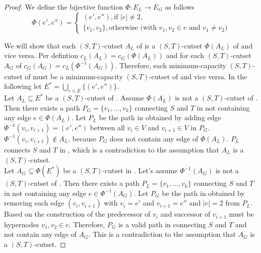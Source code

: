 \begin{proof}


We define the bijective function $\Phi: E_L \rightarrow E_G$ as follows
\[ \Phi(e',e'') = 
   \begin{cases}
      (e',e''), \text{if } |e| \neq 2, \\
      \{v_1,v_2\}, \text{otherwise (with $v_1,v_2 \in e$ and $v_1 \neq v_2$)}
   \end{cases} \]

We will show that each $(S,T)$-cutset $A_L$ of  is a $(S,T)$-cutset $\Phi(A_L)$ of
 and vice versa. Per defintion $c_L(A_L) = c_G(\Phi(A_L))$ and for each $(S,T)$-cutset
$A_G$ of  $c_G(A_G) = c_L(\Phi^{-1}(A_G))$. Therefore, each minimum-capacity $(S,T)$-cutset
of  must be a minimum-capacity $(S,T)$-cutset of  and vice versa. In the following 
let $E^* = \bigcup_{e \in E} \{(e',e'')\}$. \\
Let $A_L \subseteq E^*$ be a $(S,T)$-cutset of . Assume $\Phi(A_L)$ is not a $(S,T)$-cutset
of . Then there exists a path
$P_G = \{v_1,\ldots,v_k\}$ connecting $S$ and $T$ in  not containing any edge $e \in \Phi(A_L)$.
Let $P_L$ be the path in  obtained by adding edge $\Phi^{-1}(v_i,v_{i+1}) = (e',e'')$ between all
$v_i \in V$ and $v_{i+1} \in V$ in $P_G$. $\Phi^{-1}(v_i,v_{i+1}) \notin A_L$, because
$P_G$ does not contain any edge of $\Phi(A_L)$. $P_L$ connects $S$ and
$T$ in , which is a contradiction to the assumption that $A_L$ is a $(S,T)$-cutset. \\
Let $A_G \subseteq \Phi(E^*)$ be a $(S,T)$-cutset in . Let's assume $\Phi^{-1}(A_G)$ is not
a $(S,T)$-cutset of . Then there exists a path $P_L = \{v_1,\ldots,v_k\}$ 
connecting $S$ and $T$ in  not containing any
edge $e \in \Phi^{-1}(A_G)$. Let $P_G$ be the path in  obtained by removing each edge
$(v_i,v_{i+1})$ with $v_i = e'$ and $v_{i+1} = e''$ and $|e| = 2$ from $P_L$. Based on the construction
of  the predecessor of $v_i$ and successor of $v_{i+1}$ must be hypernodes $v_1,v_2 \in e$.
Therefore, $P_G$ is a valid path in  connecting $S$ and $T$ and not contain any edge of 
$A_G$. This is a contradiction to the assumption that $A_G$ is a $(S,T)$-cutset.
\end{proof} 

